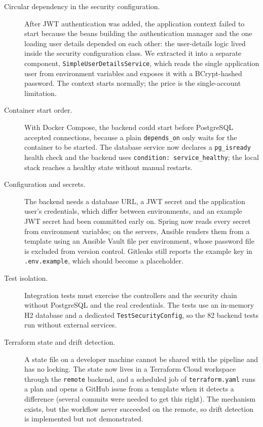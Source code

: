 \begin{description}
  \item[Circular dependency in the security configuration.] After JWT authentication was added, the application context failed to start because the beans building the authentication manager and the one loading user details depended on each other: the user-details logic lived inside the security configuration class. We extracted it into a separate component, \texttt{SimpleUserDetailsService}, which reads the single application user from environment variables and exposes it with a BCrypt-hashed password. The context starts normally; the price is the single-account limitation.
  \item[Container start order.] With Docker Compose, the backend could start before PostgreSQL accepted connections, because a plain \texttt{depends\_on} only waits for the container to be started. The database service now declares a \texttt{pg\_isready} health check and the backend uses \texttt{condition: service\_healthy}; the local stack reaches a healthy state without manual restarts.
  \item[Configuration and secrets.] The backend needs a database URL, a JWT secret and the application user's credentials, which differ between environments, and an example JWT secret had been committed early on. Spring now reads every secret from environment variables; on the servers, Ansible renders them from a template using an Ansible Vault file per environment, whose password file is excluded from version control. Gitleaks still reports the example key in \texttt{.env.example}, which should become a placeholder.
  \item[Test isolation.] Integration tests must exercise the controllers and the security chain without PostgreSQL and the real credentials. The tests use an in-memory H2 database and a dedicated \texttt{TestSecurityConfig}, so the 82 backend tests run without external services.
  \item[Terraform state and drift detection.] A state file on a developer machine cannot be shared with the pipeline and has no locking. The state now lives in a Terraform Cloud workspace through the \texttt{remote} backend, and a scheduled job of \texttt{terraform.yaml} runs a plan and opens a GitHub issue from a template when it detects a difference (several commits were needed to get this right). The mechanism exists, but the workflow never succeeded on the remote, so drift detection is implemented but not demonstrated.

\end{description}
